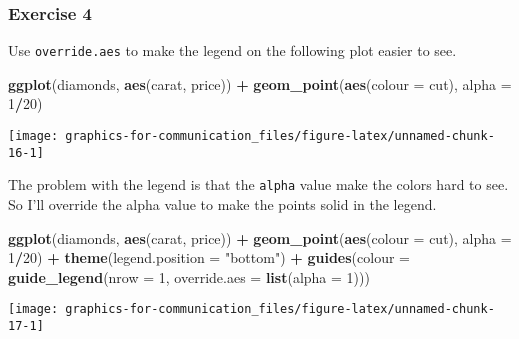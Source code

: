 \documentclass[]{book}
\newenvironment{Shaded}{\begin{snugshade}}{\end{snugshade}}
\newcommand{\DataTypeTok}[1]{\textcolor[rgb]{0.13,0.29,0.53}{#1}}
\newcommand{\DecValTok}[1]{\textcolor[rgb]{0.00,0.00,0.81}{#1}}
\newcommand{\KeywordTok}[1]{\textcolor[rgb]{0.13,0.29,0.53}{\textbf{#1}}}
\newcommand{\NormalTok}[1]{#1}
\newcommand{\OperatorTok}[1]{\textcolor[rgb]{0.81,0.36,0.00}{\textbf{#1}}}
\newcommand{\StringTok}[1]{\textcolor[rgb]{0.31,0.60,0.02}{#1}}
\theoremstyle{definition}
\theoremstyle{definition}
\theoremstyle{definition}
\theoremstyle{remark}
\begin{document}
\hypertarget{exercise-4-40}{%
\subsubsection{Exercise 4}\label{exercise-4-40}}

Use \texttt{override.aes} to make the legend on the following plot
easier to see.

\begin{Shaded}
\begin{Highlighting}[]
\KeywordTok{ggplot}\NormalTok{(diamonds, }\KeywordTok{aes}\NormalTok{(carat, price)) }\OperatorTok{+}
\StringTok{  }\KeywordTok{geom_point}\NormalTok{(}\KeywordTok{aes}\NormalTok{(}\DataTypeTok{colour =}\NormalTok{ cut), }\DataTypeTok{alpha =} \DecValTok{1}\OperatorTok{/}\DecValTok{20}\NormalTok{)}
\end{Highlighting}
\end{Shaded}

\begin{center}\texttt{[image: graphics-for-communication\_files/figure-latex/unnamed-chunk-16-1]} \end{center}

The problem with the legend is that the \texttt{alpha} value make the
colors hard to see. So I'll override the alpha value to make the points
solid in the legend.

\begin{Shaded}
\begin{Highlighting}[]
\KeywordTok{ggplot}\NormalTok{(diamonds, }\KeywordTok{aes}\NormalTok{(carat, price)) }\OperatorTok{+}
\StringTok{  }\KeywordTok{geom_point}\NormalTok{(}\KeywordTok{aes}\NormalTok{(}\DataTypeTok{colour =}\NormalTok{ cut), }\DataTypeTok{alpha =} \DecValTok{1}\OperatorTok{/}\DecValTok{20}\NormalTok{)  }\OperatorTok{+}
\StringTok{  }\KeywordTok{theme}\NormalTok{(}\DataTypeTok{legend.position =} \StringTok{"bottom"}\NormalTok{) }\OperatorTok{+}
\StringTok{  }\KeywordTok{guides}\NormalTok{(}\DataTypeTok{colour =} \KeywordTok{guide_legend}\NormalTok{(}\DataTypeTok{nrow =} \DecValTok{1}\NormalTok{, }\DataTypeTok{override.aes =} \KeywordTok{list}\NormalTok{(}\DataTypeTok{alpha =} \DecValTok{1}\NormalTok{)))  }
\end{Highlighting}
\end{Shaded}

\begin{center}\texttt{[image: graphics-for-communication\_files/figure-latex/unnamed-chunk-17-1]} \end{center}
\end{document}
